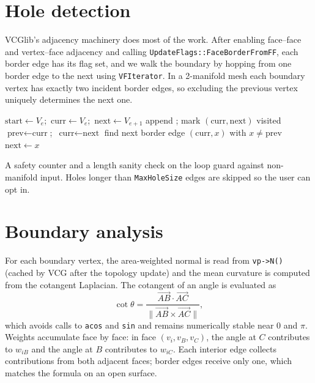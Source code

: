 \section{Hole detection}

VCGlib's adjacency machinery does most of the work. After enabling face--face and vertex--face adjacency and calling \texttt{UpdateFlags::FaceBorderFromFF}, each border edge has its flag set, and we walk the boundary by hopping from one border edge to the next using \texttt{VFIterator}. In a 2-manifold mesh each boundary vertex has exactly two incident border edges, so excluding the previous vertex uniquely determines the next one.

\begin{algorithm}[H]
\caption{Boundary loop walk}
\begin{algorithmic}[1]
        \State $\text{start} \gets V_e$;\ $\text{curr} \gets V_e$;\ $\text{next} \gets V_{e+1}$
            \State append ; mark $(\text{curr}, \text{next})$ visited
            \State $\text{prev} \gets \text{curr}$;\ $\text{curr} \gets \text{next}$
            \State find next border edge $(\text{curr}, x)$ with $x \ne \text{prev}$
            \State $\text{next} \gets x$
        \EndWhile
    \EndIf
\EndFor
\end{algorithmic}
\end{algorithm}

A safety counter and a length sanity check on the loop guard against non-manifold input. Holes longer than \texttt{MaxHoleSize} edges are skipped so the user can opt in.

\section{Boundary analysis}

For each boundary vertex, the area-weighted normal is read from \texttt{vp->N()} (cached by VCG after the topology update) and the mean curvature is computed from the cotangent Laplacian. The cotangent of an angle is evaluated as
\begin{equation}
\cot \theta = \frac{\vec{AB} \cdot \vec{AC}}{\|\vec{AB} \times \vec{AC}\|},
\end{equation}
which avoids calls to \texttt{acos} and \texttt{sin} and remains numerically stable near 0 and $\pi$. Weights accumulate face by face: in face $(v_i, v_B, v_C)$, the angle at $C$ contributes to $w_{iB}$ and the angle at $B$ contributes to $w_{iC}$. Each interior edge collects contributions from both adjacent faces; border edges receive only one, which matches the formula on an open surface.

